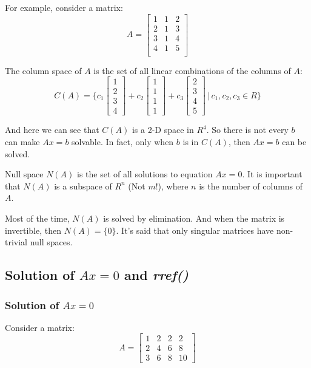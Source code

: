 \documentclass[12pt]{ctexart}
\begin{document}
For example, consider a matrix:
\[
  A = \begin{bmatrix}
    1 & 1 & 2 \\
    2 & 1 & 3 \\
    3 & 1 & 4 \\
    4 & 1 & 5 \\
  \end{bmatrix}
\]

The column space of $A$ is the set of all linear combinations of the columns of $A$:
\[
  C(A) = \{ c_1 \begin{bmatrix} 1 \\ 2 \\ 3 \\ 4 \end{bmatrix} +
           c_2 \begin{bmatrix} 1 \\ 1 \\ 1 \\ 1 \end{bmatrix} +
           c_3 \begin{bmatrix} 2 \\ 3 \\ 4 \\ 5 \end{bmatrix}
           \,|\, c_1, c_2, c_3 \in R \}
\]

And here we can see that $C(A)$ is a 2-D space in $R^{4}$. So there is not every $b$
can make $Ax = b$ solvable. In fact, only when $b$ is in $C(A)$, then $Ax = b$ can be
solved.

Null space $N(A)$ is the set of all solutions to equation $Ax = 0$. It is important
that $N(A)$ is a subspace of $R^{n}$ (Not $m$!), where $n$ is the number of columns of
$A$.

Most of the time, $N(A)$ is solved by elimination. And when the matrix is invertible,
then $N(A) = \{0\}$. It's said that only singular matrices have non-trivial null
spaces.

\subsection{\textbf{Solution of $Ax = 0$ and} \textit{rref()}}
\subsubsection{\textbf{Solution of $Ax = 0$}}
Consider a matrix:
\[
  A = \begin{bmatrix}
    1 & 2 & 2 & 2 \\
    2 & 4 & 6 & 8 \\
    3 & 6 & 8 & 10
  \end{bmatrix}
\]
\end{document}
